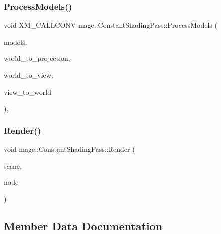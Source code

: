 \subsubsection{\texorpdfstring{Process\+Models()}{ProcessModels()}}
{\footnotesize\ttfamily void X\+M\+\_\+\+C\+A\+L\+L\+C\+O\+NV mage\+::\+Constant\+Shading\+Pass\+::\+Process\+Models (\begin{DoxyParamCaption}\item[{const vector$<$ const \hyperlink{classmage_1_1_model_node}{Model\+Node} $\ast$ $>$ \&}]{models,  }\item[{F\+X\+M\+M\+A\+T\+R\+IX}]{world\+\_\+to\+\_\+projection,  }\item[{F\+X\+M\+M\+A\+T\+R\+IX}]{world\+\_\+to\+\_\+view,  }\item[{F\+X\+M\+M\+A\+T\+R\+IX}]{view\+\_\+to\+\_\+world }\end{DoxyParamCaption})\hspace{0.3cm}{\ttfamily [private]}, {\ttfamily [noexcept]}}

\hypertarget{classmage_1_1_constant_shading_pass_a0900c426f0c4c427d81d8035c2c30f3f}{}\label{classmage_1_1_constant_shading_pass_a0900c426f0c4c427d81d8035c2c30f3f} 
\subsubsection{\texorpdfstring{Render()}{Render()}}
{\footnotesize\ttfamily void mage\+::\+Constant\+Shading\+Pass\+::\+Render (\begin{DoxyParamCaption}\item[{const \hyperlink{structmage_1_1_pass_buffer}{Pass\+Buffer} $\ast$}]{scene,  }\item[{const \hyperlink{classmage_1_1_camera_node}{Camera\+Node} $\ast$}]{node }\end{DoxyParamCaption})}



\subsection{Member Data Documentation}
\hypertarget{classmage_1_1_constant_shading_pass_a743bb9ce4f40514498f36c2d4cf0b32c}{}\label{classmage_1_1_constant_shading_pass_a743bb9ce4f40514498f36c2d4cf0b32c} 
